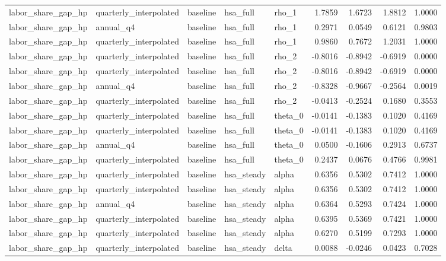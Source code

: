 \begin{tabular}{lllllrrrr}
labor\_share\_gap\_hp & quarterly\_interpolated & baseline & hsa\_full & rho\_1 & 1.7859 & 1.6723 & 1.8812 & 1.0000 \\
labor\_share\_gap\_hp & annual\_q4 & baseline & hsa\_full & rho\_1 & 0.2971 & 0.0549 & 0.6121 & 0.9803 \\
labor\_share\_gap\_hp & quarterly\_interpolated & baseline & hsa\_full & rho\_1 & 0.9860 & 0.7672 & 1.2031 & 1.0000 \\
labor\_share\_gap\_hp & quarterly\_interpolated & baseline & hsa\_full & rho\_2 & -0.8016 & -0.8942 & -0.6919 & 0.0000 \\
labor\_share\_gap\_hp & quarterly\_interpolated & baseline & hsa\_full & rho\_2 & -0.8016 & -0.8942 & -0.6919 & 0.0000 \\
labor\_share\_gap\_hp & annual\_q4 & baseline & hsa\_full & rho\_2 & -0.8328 & -0.9667 & -0.2564 & 0.0019 \\
labor\_share\_gap\_hp & quarterly\_interpolated & baseline & hsa\_full & rho\_2 & -0.0413 & -0.2524 & 0.1680 & 0.3553 \\
labor\_share\_gap\_hp & quarterly\_interpolated & baseline & hsa\_full & theta\_0 & -0.0141 & -0.1383 & 0.1020 & 0.4169 \\
labor\_share\_gap\_hp & quarterly\_interpolated & baseline & hsa\_full & theta\_0 & -0.0141 & -0.1383 & 0.1020 & 0.4169 \\
labor\_share\_gap\_hp & annual\_q4 & baseline & hsa\_full & theta\_0 & 0.0500 & -0.1606 & 0.2913 & 0.6737 \\
labor\_share\_gap\_hp & quarterly\_interpolated & baseline & hsa\_full & theta\_0 & 0.2437 & 0.0676 & 0.4766 & 0.9981 \\
labor\_share\_gap\_hp & quarterly\_interpolated & baseline & hsa\_steady & alpha & 0.6356 & 0.5302 & 0.7412 & 1.0000 \\
labor\_share\_gap\_hp & quarterly\_interpolated & baseline & hsa\_steady & alpha & 0.6356 & 0.5302 & 0.7412 & 1.0000 \\
labor\_share\_gap\_hp & annual\_q4 & baseline & hsa\_steady & alpha & 0.6364 & 0.5293 & 0.7424 & 1.0000 \\
labor\_share\_gap\_hp & quarterly\_interpolated & baseline & hsa\_steady & alpha & 0.6395 & 0.5369 & 0.7421 & 1.0000 \\
labor\_share\_gap\_hp & quarterly\_interpolated & baseline & hsa\_steady & alpha & 0.6270 & 0.5199 & 0.7293 & 1.0000 \\
labor\_share\_gap\_hp & quarterly\_interpolated & baseline & hsa\_steady & delta & 0.0088 & -0.0246 & 0.0423 & 0.7028 \\

\end{tabular}
